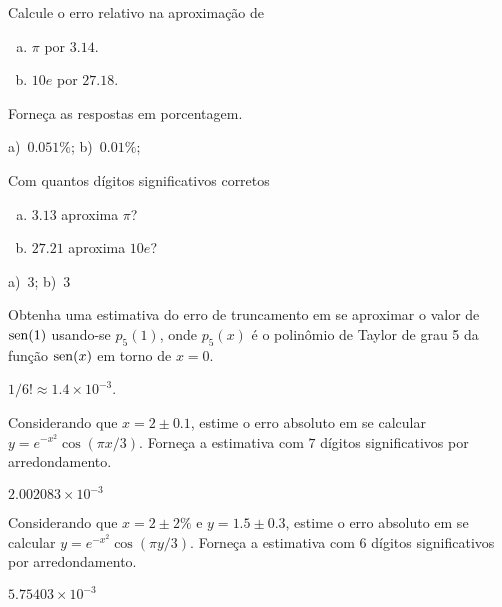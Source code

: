 \begin{exer}\label{exer:erro_rel}
  Calcule o erro relativo na aproximação de
  \begin{enumerate}[a)]
  \item $\pi$ por $3.14$.
  \item $10e$ por $27.18$.
  \end{enumerate}
  Forneça as respostas em porcentagem.
\end{exer}
\begin{resp}
  a)~$0.051\%$; b)~$0.01\%$;
\end{resp}

\begin{exer}\label{exer:dig_corr}
  Com quantos dígitos significativos corretos
  \begin{enumerate}[a)]
  \item $3.13$ aproxima $\pi$?
  \item $27.21$ aproxima $10e$?
  \end{enumerate}
\end{exer}
\begin{resp}
  a)~$3$; b)~$3$
\end{resp}


\begin{exer}
  Obtenha uma estimativa do erro de truncamento em se aproximar o valor de $\operatorname{sen}(1)$ usando-se $p_5(1)$, onde $p_5(x)$ é o polinômio de Taylor de grau 5 da função $\operatorname{sen}(x)$ em torno de $x=0$.
\end{exer}
\begin{resp}
  $1/6! \approx 1.4\times 10^{-3}$.
\end{resp}

\begin{exer}\label{exer:properro_abs1}
  Considerando que $x=2\pm 0.1$, estime o erro absoluto em se calcular $y = e^{-x^2}\cos(\pi x/3)$. Forneça a estimativa com $7$ dígitos significativos por arredondamento.
\end{exer}
\begin{resp}
  $2.002083\times 10^{-3}$
\end{resp}

\begin{exer}\label{exer:properro_abs2}
  Considerando que $x=2\pm 2\%$ e $y=1.5\pm 0.3$, estime o erro absoluto em se calcular $y = e^{-x^2}\cos(\pi y/3)$. Forneça a estimativa com $6$ dígitos significativos por arredondamento.
\end{exer}
\begin{resp}
  $5.75403\times 10^{-3}$
\end{resp}

